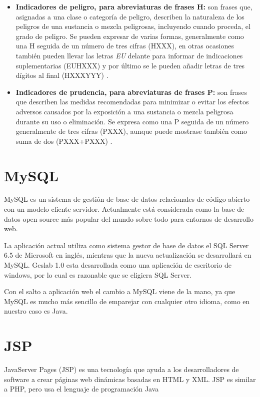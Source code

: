 \begin{itemize}
\item \textbf{Indicadores de peligro, para abreviaturas de frases H:} son frases que, asignadas a una clase o categoría de peligro, describen la naturaleza de los peligros de una sustancia o mezcla peligrosas, incluyendo cuando proceda, el grado de peligro. Se pueden expresar de varias formas, generalmente como una H seguida de un número de tres cifras (HXXX), en otras ocasiones también pueden llevar las letras \textit{EU} delante para informar de indicaciones suplementarias (EUHXXX) y por último se le pueden añadir letras de tres dígitos al final (HXXXYYY) \cite{Seguridad}.


\item \textbf{Indicadores de prudencia, para abreviaturas de frases P:} son frases que describen las medidas recomendadas para minimizar o evitar los efectos adversos causados por la exposición a una sustancia o mezcla peligrosa durante su uso o eliminación. Se expresa como una P seguida de un número generalmente de tres cifras (PXXX), aunque puede mostrase también como suma de dos (PXXX+PXXX)  \cite{Seguridad}.

\end{itemize}

\section{MySQL}

MySQL es un sistema de gestión de base de datos relacionales de código abierto con un modelo cliente servidor. Actualmente está considerada como la base de datos open source más popular del mundo sobre todo para entornos de desarrollo web.

La aplicación actual utiliza como sistema gestor de base de datos el SQL Server 6.5 de Microsoft en inglés, mientras que la  nueva actualización se desarrollará en MySQL. Geslab 1.0 esta desarrollada como una aplicación de escritorio de windows, por lo cual es razonable que se eligiera SQL Server.

Con el salto a aplicación web el cambio a MySQL viene de la mano, ya que MySQL es mucho más sencillo de emparejar con cualquier otro idioma, como en nuestro caso es Java.


\section{JSP}

JavaServer Pages (JSP) es una tecnología que ayuda a los desarrolladores de software a crear páginas web dinámicas basadas en HTML y XML. JSP es similar a PHP, pero usa el lenguaje de programación Java \cite{wiki:JSP}

